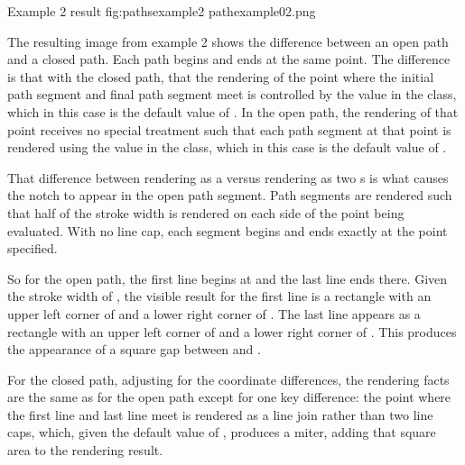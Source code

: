 \begin{importgraphiciotwod}
{Example 2 result}
{fig:pathsexample2}
{pathexample02.png}
\end{importgraphiciotwod}

\FloatBarrier

\pnum
The resulting image from example 2 shows the difference between an open path and a closed path. Each path begins and ends at the same point. The difference is that with the closed path, that the rendering of the point where the initial path segment and final path segment meet is controlled by the  value in the  class, which in this case is the default value of . In the open path, the rendering of that point receives no special treatment such that each path segment at that point is rendered using the  value in the  class, which in this case is the default value of .

\pnum
That difference between rendering as a  versus rendering as two s is what causes the notch to appear in the open path segment. Path segments are rendered such that half of the stroke width is rendered on each side of the point being evaluated. With no line cap, each segment begins and ends exactly at the point specified.

\pnum
So for the open path, the first line begins at  and the last line ends there. Given the stroke width of , the visible result for the first line is a rectangle with an upper left corner of  and a lower right corner of . The last line appears as a rectangle with an upper left corner of  and a lower right corner of . This produces the appearance of a square gap between  and .

\pnum
For the closed path, adjusting for the coordinate differences, the rendering facts are the same as for the open path except for one key difference: the point where the first line and last line meet is rendered as a line join rather than two line caps, which, given the default value of , produces a miter, adding that square area to the rendering result.

